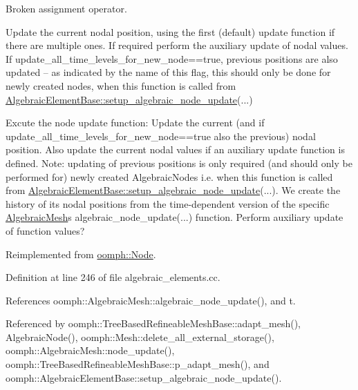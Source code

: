 Broken assignment operator. 

Update the current nodal position, using the first (default) update function if there are multiple ones. If required perform the auxiliary update of nodal values. If update\+\_\+all\+\_\+time\+\_\+levels\+\_\+for\+\_\+new\+\_\+node==true, previous positions are also updated -- as indicated by the name of this flag, this should only be done for newly created nodes, when this function is called from \hyperlink{classoomph_1_1AlgebraicElementBase_ab9ada27015d5cb28ae00b086ace3600f}{Algebraic\+Element\+Base\+::setup\+\_\+algebraic\+\_\+node\+\_\+update}(...)

Excute the node update function\+: Update the current (and if update\+\_\+all\+\_\+time\+\_\+levels\+\_\+for\+\_\+new\+\_\+node==true also the previous) nodal position. Also update the current nodal values if an auxiliary update function is defined. Note\+: updating of previous positions is only required (and should only be performed for) newly created Algebraic\+Nodes i.\+e. when this function is called from \hyperlink{classoomph_1_1AlgebraicElementBase_ab9ada27015d5cb28ae00b086ace3600f}{Algebraic\+Element\+Base\+::setup\+\_\+algebraic\+\_\+node\+\_\+update}(...). We create the history of its nodal positions from the time-\/dependent version of the specific \hyperlink{classoomph_1_1AlgebraicMesh}{Algebraic\+Mesh}\textquotesingle{}s algebraic\+\_\+node\+\_\+update(...) function. Perform auxiliary update of function values? 

Reimplemented from \hyperlink{classoomph_1_1Node_aecf8c979266300d3609de2b4ddfa3cc8}{oomph\+::\+Node}.



Definition at line 246 of file algebraic\+\_\+elements.\+cc.



References oomph\+::\+Algebraic\+Mesh\+::algebraic\+\_\+node\+\_\+update(), and t.



Referenced by oomph\+::\+Tree\+Based\+Refineable\+Mesh\+Base\+::adapt\+\_\+mesh(), Algebraic\+Node(), oomph\+::\+Mesh\+::delete\+\_\+all\+\_\+external\+\_\+storage(), oomph\+::\+Algebraic\+Mesh\+::node\+\_\+update(), oomph\+::\+Tree\+Based\+Refineable\+Mesh\+Base\+::p\+\_\+adapt\+\_\+mesh(), and oomph\+::\+Algebraic\+Element\+Base\+::setup\+\_\+algebraic\+\_\+node\+\_\+update().

\mbox{\label{classoomph_1_1AlgebraicNode_a8887f3a7c445b098835a7703c3a19bd2}} 
